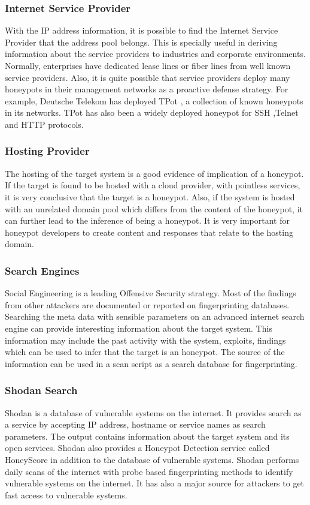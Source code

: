 \documentclass[letterpaper, 10 pt, conference]{ieeeconf}  %
\begin{document}
\subsubsection{Internet Service Provider}
With the IP address information, it is possible to find the Internet Service Provider that the address pool belongs. This is specially useful in deriving information about the service providers to industries and corporate environments. Normally, enterprises have dedicated lease lines or fiber lines from well known service providers. Also, it is quite possible that service providers deploy many honeypots in their management networks as a proactive defense strategy. For example, Deutsche Telekom has deployed TPot \cite{TPot}, a collection of known honeypots in its networks. TPot has also been a widely deployed honeypot for SSH ,Telnet and HTTP protocols. 
\newline
\subsubsection{Hosting Provider}
The hosting of the target system is a good evidence of implication of a honeypot. If the target is found to be hosted with a cloud provider, with pointless services, it is very conclusive that the target is a honeypot. Also, if the system is hosted with an unrelated domain pool which differs from the content of the honeypot, it can further lead to the inference of being a honeypot. It is very important for honeypot developers to create content and responses that relate to the hosting domain.  
\newline
\subsubsection{Search Engines}
Social Engineering is a leading Offensive Security strategy. Most of the findings from other attackers are documented or reported on fingerprinting databases. Searching the meta data with sensible parameters on an advanced internet search engine can provide interesting information about the target system. This information may include the past activity with the system, exploits, findings which can be used to infer that the target is an honeypot. The source of the information can be used in a scan script as a search database for fingerprinting. 
\newline
\subsubsection{Shodan Search}
Shodan is a database of vulnerable systems on the internet. It provides search as a service by accepting IP address, hostname or service names as search parameters. The output contains information about the target system and its open services. Shodan also provides a Honeypot Detection service called HoneyScore \cite{SHODAN} in addition to the database of vulnerable systems. Shodan performs daily scans of the internet with probe based fingerprinting methods to identify vulnerable systems on the internet. It has also a major source for attackers to get fast access to vulnerable systems. 
\newline
\end{document}
